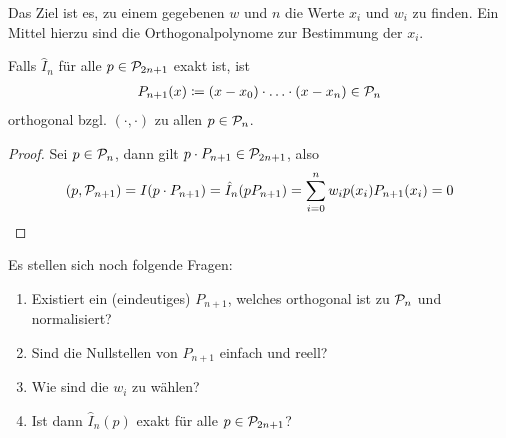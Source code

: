 \documentclass[ngerman,fontsize=11pt, paper=a4, parskip=half, titlepage=true, toc=bib]{scrbook}
\begin{document}
Das Ziel ist es, zu einem gegebenen $w$ und $n$
die Werte $x_i$ und $w_i$ zu finden.
Ein Mittel hierzu sind die Orthogonalpolynome
zur Bestimmung der $x_i$.


\begin{Leme}
  \label{7.4.3}
Falls $\hat{I}_n$ für alle $p\in\mathcal{P}_{2n+1}$ exakt ist, ist 
\begin{gather*}
  P_{n+1}(x)\coloneqq (x-x_0)\cdot \ldots\cdot (x-x_n)\in\mathcal{P}_n
\end{gather*}
orthogonal bzgl. $(\cdot,\cdot)$ zu allen $p\in\mathcal{P}_n$.

\begin{proof}
  Sei $p\in\mathcal{P}_n$, dann gilt 
$p\cdot P_{n+1}\in\mathcal{P}_{2n+1}$, also 
\begin{gather*}
  (p,\mathcal{P}_{n+1})=I(p\cdot P_{n+1})
  = \hat{I}_n(pP_{n+1})
  =\sum_{i=0}^nw_ip(x_i)P_{n+1}(x_i) 
  = 0
\end{gather*}
\end{proof}

Es stellen sich noch folgende Fragen:
\begin{enumerate}
\item Existiert ein (eindeutiges) $P_{n+1}$,
welches orthogonal ist zu $\mathcal{P}_n$ und normalisiert?
\item Sind die Nullstellen von $P_{n+1}$ einfach und reell?
\item Wie sind die $w_i$ zu wählen?
\item Ist dann $\hat{I}_n(p)$ exakt für alle $p\in\mathcal{P}_{2n+1}$?
\end{enumerate}
\end{Leme}
\end{document}
